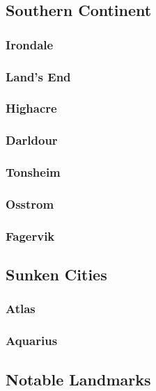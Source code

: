 	\subsection{Southern Continent}

		\subsubsection{Irondale}

		\subsubsection{Land's End}

		\subsubsection{Highacre}
	
		\subsubsection{Darldour}

		\subsubsection{Tonsheim}

		\subsubsection{Osstrom}

		\subsubsection{Fagervik}

	\subsection{Sunken Cities}

		\subsubsection{Atlas}

		\subsubsection{Aquarius}
	
	\subsection{Notable Landmarks}

